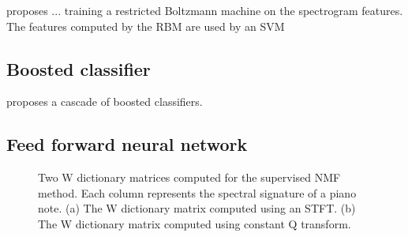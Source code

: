\documentclass[5p]{elsarticle}
\begin{document}
\citet{nam2011classification} proposes ...
 training a restricted Boltzmann machine on the spectrogram features. The features computed by the RBM are used by an SVM 


\subsection{Boosted classifier}

\citet{boogaart2009note} proposes a cascade of boosted classifiers.

\subsection{Feed forward neural network}




\begin{figure}[t]
\begin{center}
\end{center}
\caption{ Two W dictionary matrices computed for the supervised NMF method. Each column represents the spectral signature of a piano note. (a) The W dictionary matrix computed using an STFT. (b) The W dictionary matrix computed using constant Q transform.}
\end{figure}
\end{document}
